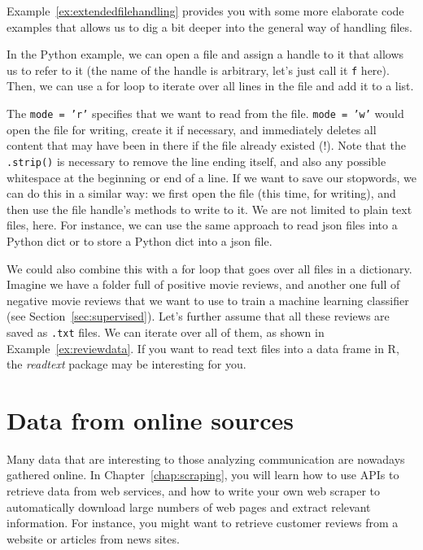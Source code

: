 Example~\ref{ex:extendedfilehandling} provides you with some more elaborate code examples that allows us to dig a bit deeper into the general way of handling files.

In the Python example,  we can open a file and assign a handle to it that allows us to refer to it (the name of the handle is arbitrary, let's just call it \texttt{f} here).
Then, we can use a for loop to iterate over all lines in the file and add it to a list.

The \texttt{mode = 'r'} specifies that we want to read from the file. \texttt{mode = 'w'} would open the file for writing, create it if necessary, and immediately deletes all content that may have been in there if the file already existed (!).
Note that the \texttt{.strip()} is necessary to remove the line ending itself, and also any possible whitespace at the beginning or end of a line.
If we want to save our stopwords, we can do this in a similar way: we first open the file (this time, for writing), and then use the file handle's methods to write to it.
We are not limited to plain text files, here. For instance, we can use the same approach to read json files into a Python dict or to store a Python dict into a json file.

We could also combine this with a for loop that goes over all files in a dictionary.
Imagine we have a folder full of positive movie reviews, and another one full of negative movie reviews that we want to use to train a machine learning classifier (see Section~\ref{sec:supervised}).
Let's further assume that all these reviews are saved as \texttt{.txt} files.
We can iterate over all of them, as shown in Example~\ref{ex:reviewdata}. If you want to read text files into a data frame in R, the \emph{readtext} package may be interesting for you.


\section{Data from online sources}
\label{sec:gathering}

Many data that are interesting to those analyzing communication are
nowadays gathered online. In Chapter~\ref{chap:scraping}, you will
learn how to use APIs to retrieve data from web services, and how to
write your own web scraper to automatically download large numbers of
web pages and extract relevant information. For instance, you might
want to retrieve customer reviews from a website or articles from news
sites.

